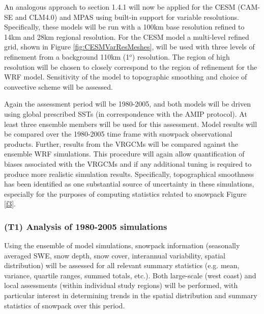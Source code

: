 \documentclass[11pt]{article}
\begin{document}
An analogous approach to section 1.4.1 will now be applied  for  the  CESM  (CAM-SE and CLM4.0) and MPAS using built-in support for variable resolutions.  Specifically, these models will be run with a 100km base resolution refined to 14km and 28km regional resolution. For the CESM model a multi-level refined grid, shown in Figure \ref{fig:CESMVarResMeshes}, will be used with three levels of refinement from a background 110km (1$^{o}$) resolution. The region of high resolution will be chosen to closely correspond to the region of refinement for the WRF model.  Sensitivity of the model to topographic smoothing and choice of convective scheme will be assessed.  %

Again the assessment period will be 1980-2005, and both models will be driven using global prescribed SSTs (in correspondence with the AMIP protocol).  At least three ensemble members will be used for this assessment. Model results will be compared over the 1980-2005 time frame with snowpack observational products. Further, results from the VRGCMs will be compared against the ensemble WRF simulations. This procedure will again allow quantification of biases associated with the VRGCMs and if any additional tuning is required to produce more realistic simulation results.  Specifically, topographical smoothness has been identified as one substantial source of uncertainty in these simulations, especially for the purposes of computing statistics related to snowpack Figure \ref{f3}.

\subsubsection{(T1) Analysis of 1980-2005 simulations}

Using the ensemble of model simulations, snowpack information (seasonally averaged SWE, snow depth, snow cover, interannual variability, spatial distribution) will be assessed for all relevant summary statistics (e.g. mean, variance, quartile ranges, summed totals, etc.). Both large-scale (west coast) and local assessments (within individual study regions) will be performed, with particular interest in determining trends in the spatial distribution and summary statistics of snowpack over this period.

\end{document}
